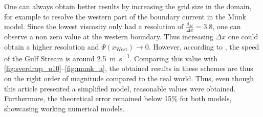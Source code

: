 One can always obtain better results by increasing the grid size in the domain, for example to resolve the western part of the boundary current in the Munk model. Since the lowest viscosity only had a resolution of $\tfrac{\delta_M}{\Delta x}=3.8$, one can observe a non zero value at the western boundary. Thus increasing $\Delta x$ one could obtain a higher resolution and $\Psi\left(x_\text{West}\right)\rightarrow 0$. However, according to \citet{Steele2008eos}, the speed of the Gulf Stream is around \SI{2.5}{\meter\per\second}. Comparing this value with \autoref{fig:sverdrup_u10}--\ref{fig:munk_a}, the obtained results in these schemes are thus on the right order of magnitude compared to the real world. Thus, even though this article presented a simplified model, reasonable values were obtained. Furthermore, the theoretical error remained below 15\% for both models, showcasing working numerical models.